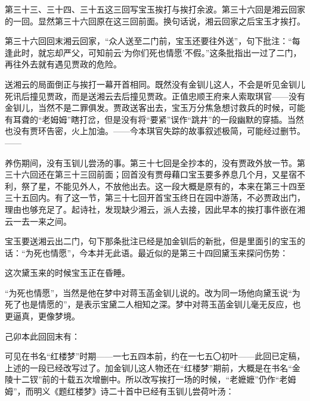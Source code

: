 \par 第三十三、三十四、三十五这三回写宝玉挨打与挨打余波。第三十六回是湘云回家的一回。显然第三十六回原在这三回前面。换句话说，湘云回家之后宝玉才挨打。
\par 第三十六回回末湘云回家，“众人送至二门前，宝玉还要往外送”，句下批注：“每逢此时，就忘却严父，可知前云‘为你们死也情愿’不假。”这条批指出一过了二门，再往外去就有遇见贾政的危险。
\par 送湘云的局面倒正与挨打一幕开首相同。既然没有金钏儿这人，不会是听见金钏儿死讯后撞见贾政，而是送湘云去后撞见贾政。正值忠顺王府来人索取琪官——没有金钏儿，当然不是二罪俱发。贾政送客出去，宝玉万分焦急想讨救兵的时候，可能有耳聋的“老姆姆”瞎打岔，但是没有将“要紧”误作“跳井”的一段幽默的穿插。当然也没有贾环告密，火上加油。——今本琪官失踪的故事叙述极简，可能经过删节。——
\par 养伤期间，没有玉钏儿尝汤的事。第三十七回是全抄本的，没有贾政外放一节。第三十六回还在第三十三回前面；回首没有贾母藉口宝玉要多养息几个月，又星宿不利，祭了星，不能见外人，不放他出去。这一段大概是原有的，本来在第三十四至三十五回内。有了这一节，第三十七回开首宝玉终日在园中游荡，不必贾政出门，理由也够充足了。起诗社，发现缺少湘云，派人去接，因此早本的挨打事件嵌在湘云一去一来之间。
\par 宝玉要送湘云出二门，句下那条批注已经是加金钏后的新批，但是里面引的宝玉的话：“为死也情愿”，今本并无此语。最近似的是第三十四回黛玉来探问伤势：
\par 这次黛玉来的时候宝玉正在昏睡。
\par “为死也情愿”，当然是他在梦中对蒋玉菡金钏儿说的。改为同一场他向黛玉说“为死了也是情愿的”，是表示宝黛二人相知之深。梦中对蒋玉菡金钏儿毫无反应，也更逼真，更像梦境。
\par 己卯本此回回末有：
\par 可见在书名“红楼梦”时期——一七五四本前，约在一七五〇初叶——此回已定稿，上述的一段已经改写过了。加金钏儿这人物还在“红楼梦”期前，大概是在书名“金陵十二钗”前的十载五次增删中。所以改写挨打一场的时候，“老嬷嬷”仍作“老姆姆”，而明义《题红楼梦》诗二十首中已经有玉钏儿尝荷叶汤：
